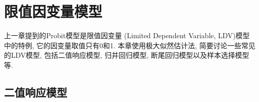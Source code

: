 \documentclass[cn, 12pt, math=mtpro2, bibstyle=apa, blue, twocol]{elegantbook}
\newcommand{\hb}{\hat{\beta}}
\newcommand{\BS}{\mathbold{\Sigma}}
\begin{document}






\chapter{限值因变量模型}
上一章提到的Probit模型是限值因变量 (Limited Dependent Variable, LDV)模型中的特例, 它的因变量取值只有0和1. 本章使用极大似然估计法, 简要讨论一些常见的LDV模型, 包括二值响应模型, 归并回归模型, 断尾回归模型以及样本选择模型等.
\section{二值响应模型}
\end{document}
